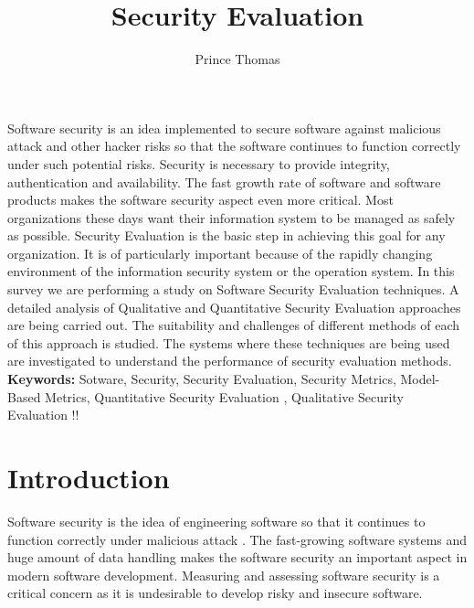 \documentclass[pdftex,english,oribibl]{llncs}
\title{Security Evaluation}
\author{Prince Thomas}
\institute{University of Stuttgart\\Institute of Software Technology (ISTE)\\70569 Stuttgart, Germany}
\makeatletter
\gdef\@keywords{}
\renewenvironment{abstract}{%
  \list{}{\advance\topsep by0.35cm\relax\small%
          \leftmargin=1cm%
          \labelwidth=\z@%
          \listparindent=\z@%
          \itemindent\listparindent%
          \rightmargin\leftmargin}%
          \item[\hskip\labelsep\bfseries\abstractname]}{%
  \if!\@keywords!\else{\item[~]\item[\hskip\labelsep\bfseries\keywordname]\@keywords}\fi%
  \endlist}
\makeatother
\begin{document}
\maketitle

\begin{abstract}
Software security is an idea implemented to secure software against malicious attack and other hacker risks so that the software continues to function correctly under such potential risks. Security is necessary to provide integrity, authentication and availability. The fast growth rate of software and software products makes the software security aspect even more critical. Most organizations these days want their information system to be managed as safely as possible. Security Evaluation is the basic step in achieving this goal for any organization. It is of particularly important because of the rapidly changing environment of the information security system or the operation system. In this survey we are performing a study on Software Security Evaluation techniques. A detailed analysis of Qualitative and Quantitative Security Evaluation approaches are being carried out. The suitability and challenges of different methods of each of this approach is studied. The systems where these techniques are being used are investigated to understand the performance of security evaluation methods.\\

\textbf{Keywords:} Sotware, Security, Security Evaluation, Security Metrics, Model-Based Metrics, Quantitative Security Evaluation , Qualitative Security Evaluation
\end{abstract}


\section{Introduction}

  Software security is the idea of engineering software so that it continues to function correctly under malicious attack \cite{1281254_McGraw}. The fast-growing software systems and huge amount of data handling makes the software security an important aspect in modern software development. Measuring and assessing software security is a critical concern as it is undesirable to develop risky and insecure software. 
  
\end{document}
